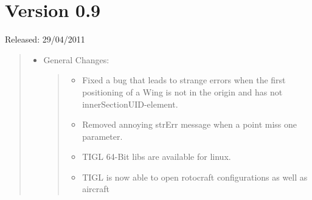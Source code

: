 \documentclass[]{scrartcl}
\begin{document}
\section{Version 0.9}\label{version-0.9}

Released: 29/04/2011

\begin{quote}
\begin{itemize}
\item
  General Changes:

  \begin{quote}
  \begin{itemize}
  \itemsep1pt\parskip0pt
  \item
    Fixed a bug that leads to strange errors when the first positioning
    of a Wing is not in the origin and has not innerSectionUID-element.
  \item
    Removed annoying strErr message when a point miss one parameter.
  \item
    TIGL 64-Bit libs are available for linux.
  \item
    TIGL is now able to open rotocraft configurations as well as
    aircraft
  \end{itemize}
  \end{quote}
\end{itemize}
\end{quote}
\end{document}
